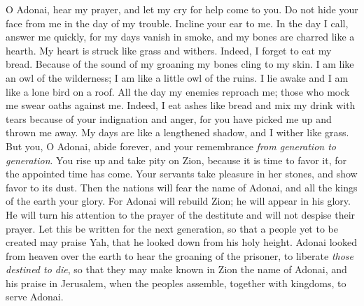 \begin{biblechapter} %
 O Adonai, hear my prayer, 
and let my cry for help come to you.
\verse Do not hide your face from me 
in the day of my trouble. 
Incline your ear to me. 
In the day I call, answer me quickly,
\verse for my days vanish in smoke, 
and my bones are charred like a hearth.
\verse My heart is struck like grass and withers. 
Indeed, I forget to eat my bread.
\verse Because of the sound of my groaning 
my bones cling to my skin.
\verse I am like an owl of the wilderness; 
I am like a little owl of the ruins.
\verse I lie awake and I am 
like a lone bird on a roof.
\verse All the day my enemies reproach me; 
those who mock me swear oaths against me.
\verse Indeed, I eat ashes like bread 
and mix my drink with tears
\verse because of your indignation and anger, 
for you have picked me up and thrown me away.
\verse My days are like a lengthened shadow, 
and I wither like grass.
\verse But you, O Adonai, abide forever, 
and your remembrance \textit{from generation to generation}.
\verse You rise up and take pity on Zion, 
because it is time to favor it, 
for the appointed time has come.
\verse Your servants take pleasure in her stones, 
and show favor to its dust.
\verse Then the nations will fear the name of Adonai, 
and all the kings of the earth your glory.
\verse For Adonai will rebuild Zion; 
he will appear in his glory.
\verse He will turn his attention to the prayer of the destitute 
and will not despise their prayer.
\verse Let this be written for the next generation, 
so that a people yet to be created may praise Yah,
\verse that he looked down from his holy height. 
Adonai looked from heaven over the earth
\verse to hear the groaning of the prisoner, 
to liberate \textit{those destined to die},
\verse so that they may make known in Zion the name of Adonai, 
and his praise in Jerusalem,
\verse when the peoples assemble, 
together with kingdoms, to serve Adonai.

\end{biblechapter}
